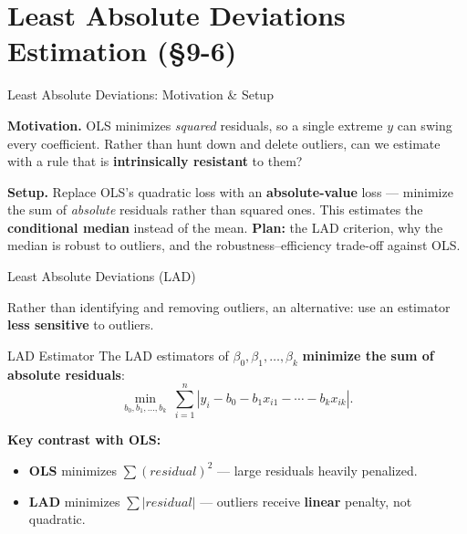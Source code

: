 \documentclass[aspectratio=169, 12pt]{beamer}
\begin{document}
\section{Least Absolute Deviations Estimation (\S9-6)}

\begin{frame}{Least Absolute Deviations: Motivation \& Setup}

  \begin{highlightbox}
    \textbf{Motivation.} OLS minimizes \emph{squared} residuals, so a single extreme
    $y$ can swing every coefficient. Rather than hunt down and delete outliers, can
    we estimate with a rule that is \textbf{intrinsically resistant} to them?
  \end{highlightbox}

  \begin{keybox}
    \textbf{Setup.} Replace OLS's quadratic loss with an \textbf{absolute-value}
    loss --- minimize the sum of \emph{absolute} residuals rather than squared ones.
    This estimates the \textbf{conditional median} instead of the mean.
    \textbf{Plan:} the LAD criterion, why the median is robust to outliers, and the
    robustness--efficiency trade-off against OLS.
  \end{keybox}

\end{frame}

\begin{frame}{Least Absolute Deviations (LAD)}

  Rather than identifying and removing outliers, an alternative: use an estimator
  \textbf{less sensitive} to outliers.

  \begin{definitionbox}{LAD Estimator}
    The LAD estimators of $\beta_0, \beta_1, \ldots, \beta_k$ \textbf{minimize the sum of
    absolute residuals}:
    \[
      \min_{b_0, b_1, \ldots, b_k}\ \sum_{i=1}^n |y_i - b_0 - b_1 x_{i1} - \cdots - b_k x_{ik}|.
      \tag{9.45}
    \]
  \end{definitionbox}

  \begin{keybox}
    \textbf{Key contrast with OLS:}
    \begin{itemize}\setlength{\itemsep}{1pt}
      \item \textbf{OLS} minimizes $\sum (residual)^2$ — large residuals heavily penalized.
      \item \textbf{LAD} minimizes $\sum |residual|$ — outliers receive \textbf{linear}
      penalty, not quadratic.
    \end{itemize}
  \end{keybox}

\end{frame}
\end{document}
